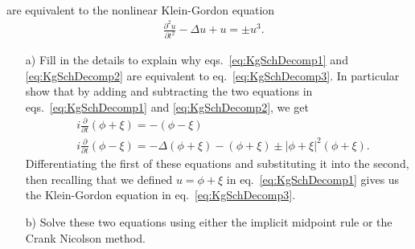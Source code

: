 \begin{enumerate}
\begin{align}
\end{align}
 are equivalent to the nonlinear Klein-Gordon equation
 \begin{align}\label{eq:KgSchDecomp3}
 &{}\frac{\partial^2u}{\partial t^2} - \Delta u + u = \pm u^3.
 \end{align}
 \begin{enumerate}
 \item[a)] Fill in the details to explain why eqs.\ \eqref{eq:KgSchDecomp1} and \eqref{eq:KgSchDecomp2} are equivalent to eq.\ \eqref{eq:KgSchDecomp3}. In particular show that by adding and subtracting the two equations in eqs.\ \eqref{eq:KgSchDecomp1} and \eqref{eq:KgSchDecomp2}, we get
 \begin{align*}
 &{} i\frac{\partial}{\partial t}\left(\phi+\xi\right)= -\left(\phi-\xi\right)
 \\&{} i\frac{\partial}{\partial t}\left(\phi-\xi\right)=-\Delta \left(\phi+\xi\right) - \left(\phi+\xi\right) \pm \left\lvert \phi+\xi \right\rvert^2\left(\phi+\xi\right).
 \end{align*}
 Differentiating the first of these equations and substituting it into the second, then recalling that we defined $u=\phi+\xi$ in eq.\ \eqref{eq:KgSchDecomp1} gives us the Klein-Gordon equation in eq.\ \eqref{eq:KgSchDecomp3}.
 \item[b)] Solve these two equations using either the implicit midpoint rule or the Crank Nicolson method.
 \end{enumerate}
\end{enumerate}
